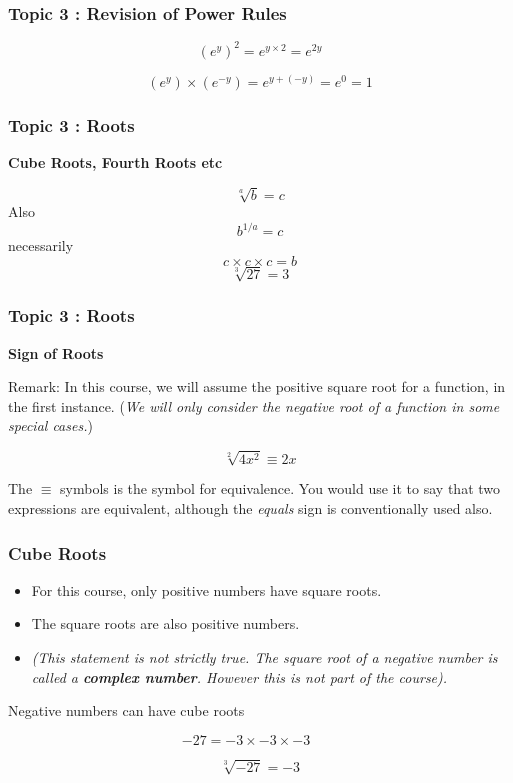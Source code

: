\documentclass{beamer}
\begin{document}
\begin{frame}
	\frametitle{Topic 3 : Revision of Power Rules}
	{
		\LARGE
		\[ (e^y)^2 = e^{y \times 2}  = e^{2y} \]
	}
	
	{
		\LARGE
		\[ (e^y) \times (e^{-y}) = e^{y + (-y)}  = e^{0} = 1 \]
	}
\end{frame}
\begin{frame}
	\frametitle{Topic 3 : Roots}
	\LARGE	\textbf{Cube Roots, Fourth Roots etc}

	\[  \sqrt[a]{b} = c \]  
	Also
	\[ b^{1/a} = c \]
	necessarily \[ c \times c \times c = b \]
	\[  \sqrt[3]{27} = 3 \]
\end{frame}
\begin{frame}
	\frametitle{Topic 3 : Roots}
	\textbf{Sign of Roots}\Large
		
	Remark: In this course, we will assume the positive square root for a function, in the first instance.
	(\textit{We will only consider the negative root of a function in some special cases.})
	
	
	\[ \sqrt[2]{4x^2} \equiv 2x \]
	
	The $\equiv$ symbols is the symbol for equivalence. You would use it to say that two expressions are equivalent, although the \textit{equals} sign is conventionally used also.
	
\end{frame}
\begin{frame}
	\frametitle{Cube Roots}
		\begin{itemize}
		\item For this course, only positive numbers have square roots. 
		\item The square roots are also positive numbers. 
		\item \textit{(This statement is not strictly true. The square root of a negative number is called a \textbf{complex number}. However this is not part of the course).}
	\end{itemize}
\end{frame}
\begin{frame}
\large
	Negative numbers can have cube roots
	
	{
		\Large
		\[ -27 = -3 \times -3 \times -3 \qquad \]
		
		\[ \sqrt[3]{-27} = -3 \]
	}
\end{frame}
\end{document}
